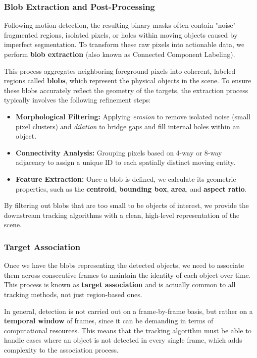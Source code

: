 \subsubsection{Blob Extraction and Post-Processing}
Following motion detection, the resulting binary masks often contain "noise"—fragmented regions, 
isolated pixels, or holes within moving objects caused by imperfect segmentation. 
To transform these raw pixels into actionable data, we perform \textbf{blob extraction} (also known as Connected Component Labeling).

This process aggregates neighboring foreground pixels into coherent, 
labeled regions called \textbf{blobs}, which represent the physical objects in the scene. 
To ensure these blobs accurately reflect the geometry of the targets, the extraction process typically involves the following refinement steps:
\begin{itemize}
    \item \textbf{Morphological Filtering:} Applying \textit{erosion} to remove isolated noise (small pixel clusters) and \textit{dilation} to bridge gaps and fill internal holes within an object.
    \item \textbf{Connectivity Analysis:} Grouping pixels based on 4-way or 8-way adjacency to assign a unique ID to each spatially distinct moving entity.
    \item \textbf{Feature Extraction:} Once a blob is defined, we calculate its geometric properties, such as the \textbf{centroid}, \textbf{bounding box}, \textbf{area}, and \textbf{aspect ratio}.
\end{itemize}
By filtering out blobs that are too small to be objects of interest, we provide the downstream tracking algorithms with a clean, high-level representation of the scene.

\subsubsection{Target Association}
Once we have the blobs representing the detected objects, we need to associate them across consecutive frames to maintain the identity of each object over time.
This process is known as \textbf{target association} and is actually common to all tracking methods, not just region-based ones.

In general, detection is not carried out on a frame-by-frame basis, but rather on a \textbf{temporal window} of frames, since it can
be demanding in terms of computational resources. 
This means that the tracking algorithm must be able to handle cases where an object is not detected in every single frame, which adds complexity to the association process.

